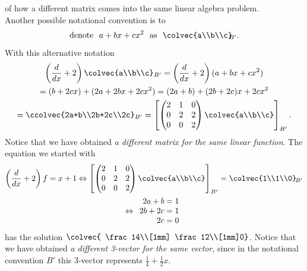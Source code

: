\begin{example}{of how a different matrix comes into the same linear algebra problem.}\\

\noindent Another possible notational convention  is to
\[\text{denote~~}a+bx+cx^2 \text{~~as~~} \colvec{a\\b\\c}_{\!\!\!B'}.\]
With this alternative notation
\begin{gather*}  \left( \frac{d}{dx}+2\right) \colvec{a\\b\\c}_{B'}
=\left( \frac{d}{dx}+2\right)(a+bx+cx^2)\\
=(b+2cx)+(2a +2bx+2cx^2 ) = (2a+b) + (2b+2c)x+2cx^2
\\
=\ccolvec{2a+b\\2b+2c\\2c}_{B'}
= 
\left[ 
\begin{pmatrix}   
2&1&0\\
0&2&2\\
0&0&2
\end{pmatrix}
\colvec{a\\b\\c}\right]_{B'}.\end{gather*}
Notice that we have obtained {\itshape a different matrix for the same linear function}. 
The  equation we started with 
\begin{gather*}
 \left( \frac{d}{dx}+2\right) f=x+1
 \Leftrightarrow
\left[ 
\begin{pmatrix}   
2&1&0\\
0&2&2\\
0&0&2
\end{pmatrix}
\colvec{a\\b\\c}\right]_{B'} = \colvec{1\\1\\0}_{\!B'}\\
\Leftrightarrow
\begin{array}{r}
2a+b=1\\
2b+2c=1\\
2c=0
\end{array}
\end{gather*}
has the solution 
$\colvec{ \frac14\\[1mm] \frac12\\[1mm]0}$. Notice that we have obtained {\itshape a different 3-vector for the same vector},  since in the notational convention $B'$ this 3-vector represents $\frac14+\frac12x$. 
\end{example}

